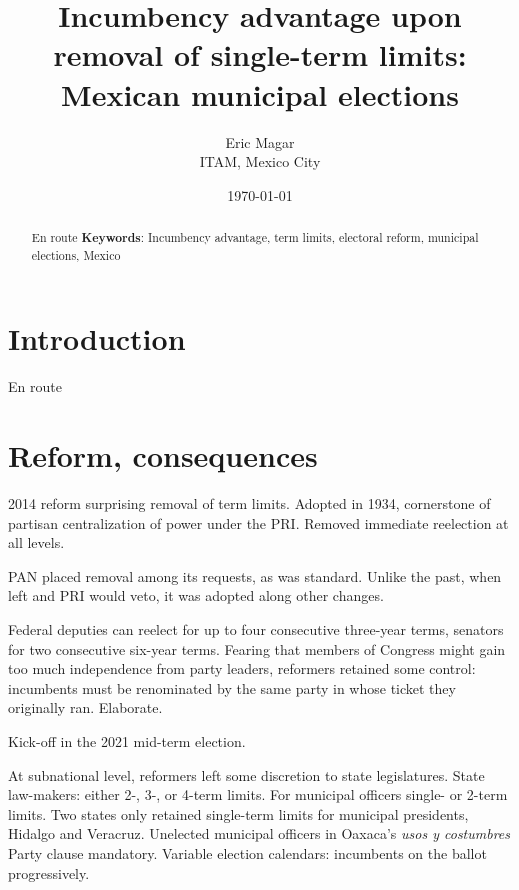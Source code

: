 \documentclass[letter,12pt]{article}
\begin{document}
\title{Incumbency advantage upon removal of single-term limits: Mexican municipal elections}
\author{Eric Magar \\ ITAM, Mexico City
}
\date{\today}
\maketitle


\begin{abstract}
\noindent En route
\newline
\newline
\textbf{Keywords}: Incumbency advantage, term limits, electoral reform, municipal elections, Mexico
\end{abstract}



\section{Introduction}

\noindent En route

\section{Reform, consequences}

2014 reform surprising removal of term limits. Adopted in 1934, cornerstone of partisan centralization of power under the PRI. Removed immediate reelection at all levels.

PAN placed removal among its requests, as was standard. Unlike the past, when left and PRI would veto, it was adopted along other changes.

Federal deputies can reelect for up to four consecutive three-year terms, senators for two consecutive six-year terms. Fearing that members of Congress might gain too much independence from party leaders, reformers retained some control: incumbents must be renominated by the same party in whose ticket they originally ran. Elaborate. 

Kick-off in the 2021 mid-term election.

At subnational level, reformers left some discretion to state legislatures. State law-makers: either 2-, 3-, or 4-term limits. For municipal officers single- or 2-term limits. Two states only retained single-term limits for municipal presidents, Hidalgo and Veracruz. Unelected municipal officers in Oaxaca's \emph{usos y costumbres} Party clause mandatory. Variable election calendars: incumbents on the ballot progressively. 
\end{document}
